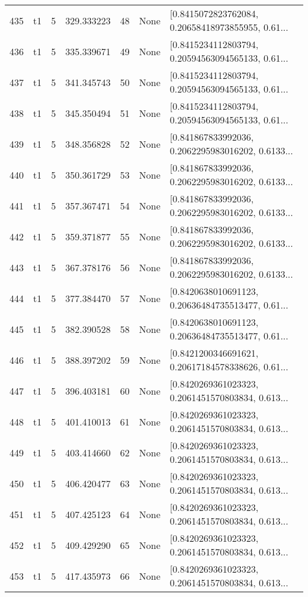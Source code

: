 \begin{tabular}{lllrlll}
435 &  t1 &   5 &  329.333223 &   48 &  None &  [0.8415072823762084, 0.20658418973855955, 0.61... \\
436 &  t1 &   5 &  335.339671 &   49 &  None &  [0.8415234112803794, 0.20594563094565133, 0.61... \\
437 &  t1 &   5 &  341.345743 &   50 &  None &  [0.8415234112803794, 0.20594563094565133, 0.61... \\
438 &  t1 &   5 &  345.350494 &   51 &  None &  [0.8415234112803794, 0.20594563094565133, 0.61... \\
439 &  t1 &   5 &  348.356828 &   52 &  None &  [0.841867833992036, 0.2062295983016202, 0.6133... \\
440 &  t1 &   5 &  350.361729 &   53 &  None &  [0.841867833992036, 0.2062295983016202, 0.6133... \\
441 &  t1 &   5 &  357.367471 &   54 &  None &  [0.841867833992036, 0.2062295983016202, 0.6133... \\
442 &  t1 &   5 &  359.371877 &   55 &  None &  [0.841867833992036, 0.2062295983016202, 0.6133... \\
443 &  t1 &   5 &  367.378176 &   56 &  None &  [0.841867833992036, 0.2062295983016202, 0.6133... \\
444 &  t1 &   5 &  377.384470 &   57 &  None &  [0.8420638010691123, 0.20636484735513477, 0.61... \\
445 &  t1 &   5 &  382.390528 &   58 &  None &  [0.8420638010691123, 0.20636484735513477, 0.61... \\
446 &  t1 &   5 &  388.397202 &   59 &  None &  [0.8421200346691621, 0.20617184578338626, 0.61... \\
447 &  t1 &   5 &  396.403181 &   60 &  None &  [0.8420269361023323, 0.2061451570803834, 0.613... \\
448 &  t1 &   5 &  401.410013 &   61 &  None &  [0.8420269361023323, 0.2061451570803834, 0.613... \\
449 &  t1 &   5 &  403.414660 &   62 &  None &  [0.8420269361023323, 0.2061451570803834, 0.613... \\
450 &  t1 &   5 &  406.420477 &   63 &  None &  [0.8420269361023323, 0.2061451570803834, 0.613... \\
451 &  t1 &   5 &  407.425123 &   64 &  None &  [0.8420269361023323, 0.2061451570803834, 0.613... \\
452 &  t1 &   5 &  409.429290 &   65 &  None &  [0.8420269361023323, 0.2061451570803834, 0.613... \\
453 &  t1 &   5 &  417.435973 &   66 &  None &  [0.8420269361023323, 0.2061451570803834, 0.613... \\

\end{tabular}
